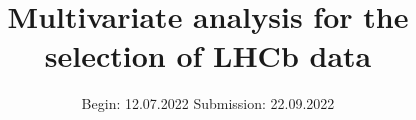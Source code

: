 


\title{Multivariate analysis for the selection of LHCb data}
\date{%
  Begin: 12.07.2022
  \hspace{3em}
  Submission:  22.09.2022
}



\maketitle
\thispagestyle{empty}
\tableofcontents
\newpage






\printbibliography{}


